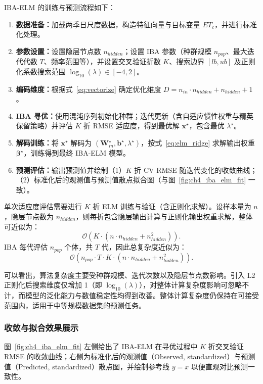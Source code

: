 \documentclass[11pt]{article}
\begin{document}
IBA-ELM 的训练与预测流程如下：
\begin{enumerate}
  \item \textbf{数据准备：}加载两季日尺度数据，构造特征向量与目标变量 $ET_c$，并进行标准化处理。
  \item \textbf{参数设置：}设置隐层节点数 $n_{hidden}$；设置 IBA 参数（种群规模 $n_{pop}$、最大迭代代数 $T$、频率范围等），并设置交叉验证折数 $K$、搜索边界 $[lb,ub]$ 及正则化系数搜索范围 $\log_{10}(\lambda)\in[-4,2]$。
  \item \textbf{编码维度：}根据式~\eqref{eq:vectorize} 确定优化维度 $D=n_{in}\cdot n_{hidden}+n_{hidden}+1$。
  \item \textbf{IBA 寻优：}使用混沌序列初始化种群；迭代更新（含自适应惯性权重与精英保留策略）并评估 $K$ 折 RMSE 适应度，得到最优解 $\mathbf{x}^\star$，包含最优 $\lambda^\star$。
  \item \textbf{解码训练：}将 $\mathbf{x}^\star$ 解码为 $(\mathbf{W}_{in}^\star,\mathbf{b}^\star,\lambda^\star)$，按式~\eqref{eq:elm_ridge} 求解输出权重 $\boldsymbol{\beta}^\star$，训练得到最终 IBA-ELM 模型。
  \item \textbf{预测评估：}输出预测值并绘制（1）$K$ 折 CV RMSE 随迭代变化的收敛曲线；（2）标准化后的观测值与预测值散点拟合图（与图~\ref{fig:ch4_iba_elm_fit} 一致）。
\end{enumerate}


单次适应度评估需要进行 $K$ 折 ELM 训练与验证（含正则化求解）。设样本量为 $n$，隐层节点数为 $n_{hidden}$，则每折包含隐层输出计算与正则化输出权重求解，整体可近似为：
\begin{equation}
\mathcal{O}\!\left(K\cdot (n\cdot n_{hidden}+n_{hidden}^2)\right).
\label{eq:fitness_complexity}
\end{equation}
IBA 每代评估 $n_{pop}$ 个体，共 $T$ 代，因此总复杂度近似为：
\begin{equation}
\mathcal{O}\!\left(n_{pop}\cdot T \cdot K\cdot (n\cdot n_{hidden}+n_{hidden}^2)\right).
\label{eq:total_complexity}
\end{equation}

可以看出，算法复杂度主要受种群规模、迭代次数以及隐层节点数影响。引入 L2 正则化后搜索维度仅增加 1（即 $\log_{10}(\lambda)$），对整体计算复杂度影响可忽略不计，而模型的泛化能力与数值稳定性均得到改善。整体计算复杂度仍保持在可接受范围内，适用于中等规模数据集的预测任务。

\subsubsection{收敛与拟合效果展示}
图~\ref{fig:ch4_iba_elm_fit} 左侧给出了 IBA-ELM 在寻优过程中 $K$ 折交叉验证 RMSE 的收敛曲线；右侧为标准化后的观测值（Observed, standardized）与预测值（Predicted, standardized）散点图，并绘制参考线 $y=x$ 以便直观对比预测一致性。
\end{document}
